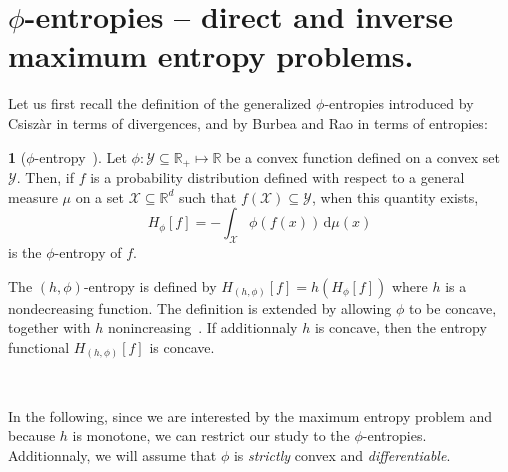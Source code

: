 \documentclass[english,sort&compress]{elsarticle}
\theoremstyle{definition}
\newtheorem{defn}{\protect\definitionname}
\theoremstyle{plain}
\theoremstyle{plain}
\providecommand{\definitionname}{Definition}
\def\dmu{\mathrm{d}\mu}
\def\Rset{\mathbb{R}}
\def\X{\mathcal{X}}
\def\Y{\mathcal{Y}}
\begin{document}
\section{$\phi$-entropies -- direct and inverse maximum entropy problems.}
\label{sec:MaxPhiEnt}

Let  us  first  recall  the   definition  of  the  generalized  $\phi$-entropies
introduced by Csisz\`ar in terms of divergences,  and by Burbea and Rao in terms
of entropies:


\begin{defn}[$\phi$-entropy~\cite{BurRao82}]
\label{def:phi-entropy}
Let $\phi: \Y \subseteq \Rset_+ \mapsto \Rset$ be a convex function defined on a
convex  set $\Y$.   Then,  if $f$  is  a probability  distribution defined  with
respect to  a general measure  $\mu$ on a  set $\X \subseteq \Rset^d$  such that
$f(\X) \subseteq \Y$, when this quantity exists,
  \begin{equation}\label{eq:phi-entropy}
    H_{\phi}[f] = - \int_\X \phi(f(x)) \, \dmu(x)
  \end{equation}
  is  the $\phi$-entropy  of  $f$.
\end{defn}
%
The $(h,\phi)$-entropy is defined by $H_{(h,\phi)}[f] = h\left(H_\phi[f]\right)$
where $h$ is  a nondecreasing function.  The definition  is extended by allowing
$\phi$  to be  concave, together  with $h$  nonincreasing~\cite{Csi67, SalMen93,
  Sal94,  MenMor97, Par06}.  If additionnaly  $h$ is  concave, then  the entropy
functional $H_{(h,\phi)}[f]$ is concave.

\

In the  following, since we  are interested by  the maximum entropy  problem and
because $h$  is monotone,  we can  restrict our  study to  the $\phi$-entropies.
Additionnaly,  we will  assume that  $\phi$ is  {\em strictly}  convex and  {\em
  differentiable}.

\
\end{document}
